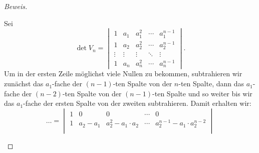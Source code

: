 \documentclass[12pt, a4paper, oneside, titlepage]{report}
\newenvironment{bew}{\begin{proof}[Beweis]}{\end{proof}}
\theoremstyle{definition}
\begin{document}
\begin{bew}
\begin{itemize}
{				Sei $$ \det V_n =
				\begin{vmatrix}
				1 & a_1 & a_1^2 & \cdots & a_1^{n-1} \\
				1 & a_2 & a_2^2 & \cdots & a_2^{n-1} \\
				\vdots & \vdots & \vdots & \ddots & \vdots \\     
				1 & a_n & a_n^2 & \cdots & a_n^{n-1}
				\end{vmatrix}.$$
				Um in der ersten Zeile möglichst viele Nullen zu bekommen, subtrahieren wir zunächst das $ a_1 $-fache der $ (n-1) $-ten Spalte von der $ n $-ten Spalte, dann das $ a_1 $-fache der $ (n-2) $-ten Spalte von der $ (n-1) $-ten Spalte und so weiter bis wir das $ a_1 $-fache der ersten Spalte von der zweiten subtrahieren. Damit erhalten wir:
				$$ \ldots = 
				\begin{vmatrix}
				1 & 0 & 0 & \cdots & 0 \\
				1 & a_2 - a_1 & a_2^2 - a_1 \cdot a_2 & \cdots & a_2^{n-1} - a_1 \cdot a_2^{n-2} \\

\end{vmatrix}$$}
\end{itemize}
\end{bew}
\end{document}

